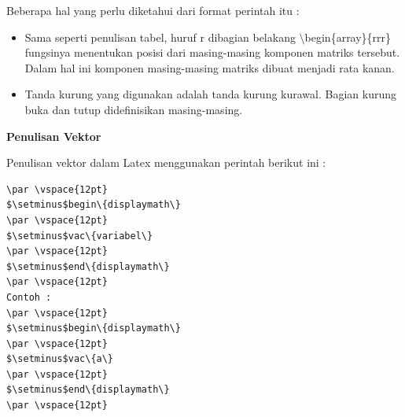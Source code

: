 Beberapa hal yang perlu diketahui dari format perintah itu :

\begin{itemize}
\item Sama seperti penulisan tabel, huruf r dibagian belakang 
$\setminus$begin\{array\}\{rrr\} fungsinya menentukan posisi dari masing-masing komponen matriks tersebut. Dalam hal ini komponen masing-masing matriks dibuat menjadi rata kanan.
\item Tanda kurung yang digunakan adalah tanda kurung kurawal. Bagian kurung buka dan tutup didefinisikan masing-masing.
\end{itemize}


\textbf{Penulisan Vektor}\par \vspace{12pt}

Penulisan vektor dalam Latex menggunakan perintah berikut ini :
\begin{verbatim}
\par \vspace{12pt}
$\setminus$begin\{displaymath\}
\par \vspace{12pt}
$\setminus$vac\{variabel\}
\par \vspace{12pt}
$\setminus$end\{displaymath\}
\par \vspace{12pt}
Contoh :
\par \vspace{12pt}
$\setminus$begin\{displaymath\}
\par \vspace{12pt}
$\setminus$vac\{a\}
\par \vspace{12pt}
$\setminus$end\{displaymath\}
\par \vspace{12pt}
\end{verbatim}

